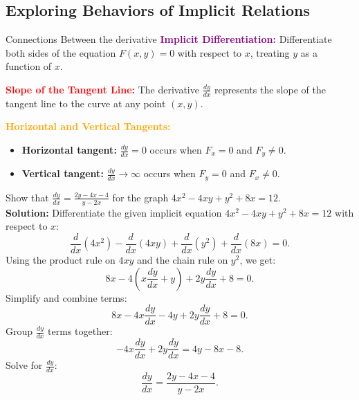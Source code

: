 \documentclass[12pt]{article}
\theoremstyle{beautifulthm}
\begin{document}
\subsection{Exploring Behaviors of Implicit Relations}

\begin{Note}{Connections Between the derivative}
\noindent\textbf{\textcolor{purple}{Implicit Differentiation:}}
Differentiate both sides of the equation \( F(x, y) = 0 \) with respect to \( x \), treating \( y \) as a function of \( x \). 
\vspace{5pt}

\noindent\textbf{\textcolor{red}{Slope of the Tangent Line:}}  
The derivative \( \frac{dy}{dx} \) represents the slope of the tangent line to the curve at any point \( (x, y) \).

\vspace{5pt}

\noindent\textbf{\textcolor{orange}{Horizontal and Vertical Tangents:}}  
\begin{itemize}
    \item \textbf{Horizontal tangent:} \( \frac{dy}{dx} = 0 \) occurs when \( F_x = 0 \) and \( F_y \neq 0 \).
    \item \textbf{Vertical tangent:} \( \frac{dy}{dx} \to \infty \) occurs when \( F_y = 0 \) and \( F_x \neq 0 \).
\end{itemize}
\end{Note}

\begin{tcolorbox}[colback=examplebg, colframe=red!75!black, title=\textbf{EXAMPLE 1:Differentiate the given implicit equation}, fonttitle=\bfseries, sharp corners]
\noindent Show that $\frac{dy}{dx} = \frac{2y - 4x - 4}{y - 2x}$ for the graph $4x^2 - 4xy + y^2 + 8x = 12$.\\
\tcblower
\textbf{Solution:} 
Differentiate the given implicit equation $4x^2 - 4xy + y^2 + 8x = 12$ with respect to $x$:
\[
\frac{d}{dx}(4x^2) - \frac{d}{dx}(4xy) + \frac{d}{dx}(y^2) + \frac{d}{dx}(8x) = 0.
\]
Using the product rule on $4xy$ and the chain rule on $y^2$, we get:
\[
8x - 4\left( x\frac{dy}{dx} + y \right) + 2y\frac{dy}{dx} + 8 = 0.
\]
Simplify and combine terms:
\[
8x - 4x\frac{dy}{dx} - 4y + 2y\frac{dy}{dx} + 8 = 0.
\]
Group $\frac{dy}{dx}$ terms together:
\[
-4x\frac{dy}{dx} + 2y\frac{dy}{dx} = 4y - 8x - 8.
\]
Solve for $\frac{dy}{dx}$:
\[
\frac{dy}{dx} = \frac{2y - 4x - 4}{y - 2x}.
\]
\end{tcolorbox}
\end{document}
